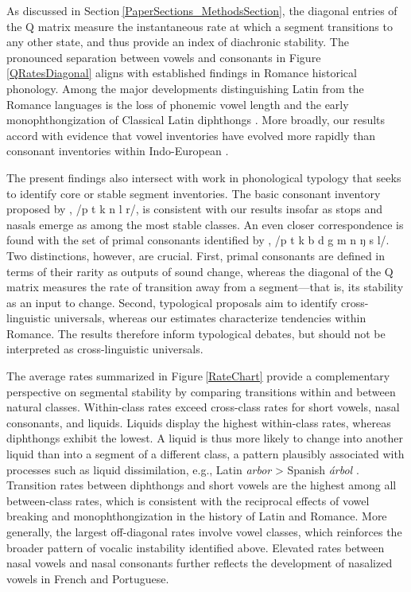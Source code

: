 \documentclass[numsec,webpdf,modern,large,namedate]{oup-authoring-template}
\begin{document}
As discussed in Section$~$\ref{PaperSections_MethodsSection}, the diagonal entries of the Q matrix measure the instantaneous rate at which a segment transitions to any other state, and thus provide an index of diachronic stability. The pronounced separation between vowels and consonants in Figure$~$\ref{QRatesDiagonal} aligns with established findings in Romance historical phonology. Among the major developments distinguishing Latin from the Romance languages is the loss of phonemic vowel length \citep{Janson1979,Loporcaro2015} and the early monophthongization of Classical Latin diphthongs \citep[p. 106]{Posner1996}. More broadly, our results accord with evidence that vowel inventories have evolved more rapidly than consonant inventories within Indo-European \citep[pp. 92--95]{Moran2021}. 

The present findings also intersect with work in phonological typology that seeks to identify core or stable segment inventories. The basic consonant inventory proposed by \citet{Nikolaev2020}, /p t k n l r/, is consistent with our results insofar as stops and nasals emerge as among the most stable classes. An even closer correspondence is found with the set of primal consonants identified by \citet{Bybee2022}, /p t k b d g m n ŋ s l/. Two distinctions, however, are crucial. First, primal consonants are defined in terms of their rarity as outputs of sound change, whereas the diagonal of the Q matrix measures the rate of transition away from a segment---that is, its stability as an input to change. Second, typological proposals aim to identify cross-linguistic universals, whereas our estimates characterize tendencies within Romance. The results therefore inform typological debates, but should not be interpreted as cross-linguistic universals. 

The average rates summarized in Figure$~$\ref{RateChart} provide a complementary perspective on segmental stability by comparing transitions within and between natural classes. Within-class rates exceed cross-class rates for short vowels, nasal consonants, and liquids. Liquids display the highest within-class rates, whereas diphthongs exhibit the lowest. A liquid is thus more likely to change into another liquid than into a segment of a different class, a pattern plausibly associated with processes such as liquid dissimilation, e.g., Latin \textit{arbor} > Spanish \textit{\'{a}rbol} \citep{Abrego2013,Mueller2013}. Transition rates between diphthongs and short vowels are the highest among all between-class rates, which is consistent with the reciprocal effects of vowel breaking and monophthongization in the history of Latin and Romance. More generally, the largest off-diagonal rates involve vowel classes, which reinforces the broader pattern of vocalic instability identified above. Elevated rates between nasal vowels and nasal consonants further reflects the development of nasalized vowels in French and Portuguese. 
\end{document}
